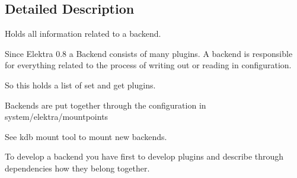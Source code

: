 \subsection{Detailed Description}
Holds all information related to a backend.

Since Elektra 0.8 a Backend consists of many plugins. A backend is responsible for everything related to the process of writing out or reading in configuration.

So this holds a list of set and get plugins.

Backends are put together through the configuration in system/elektra/mountpoints

See kdb mount tool to mount new backends.

To develop a backend you have first to develop plugins and describe through dependencies how they belong together. 

